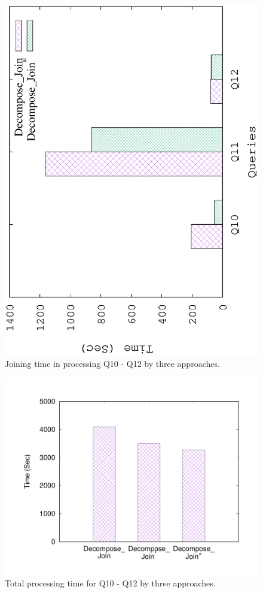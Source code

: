 \begin{figure}[H]
\centering
\includegraphics[scale=0.5, angle=270]{plot/threejoin}
\caption{Joining time in processing Q10 - Q12 by three approaches.}
\label{fig:threejoin}
\end{figure}
\begin{figure}[H]
\centering
\includegraphics[scale=0.5, angle=270]{plot/threetotal}
\caption{Total processing time for Q10 - Q12 by three approaches.}
\label{fig:threetotal}
\end{figure}

